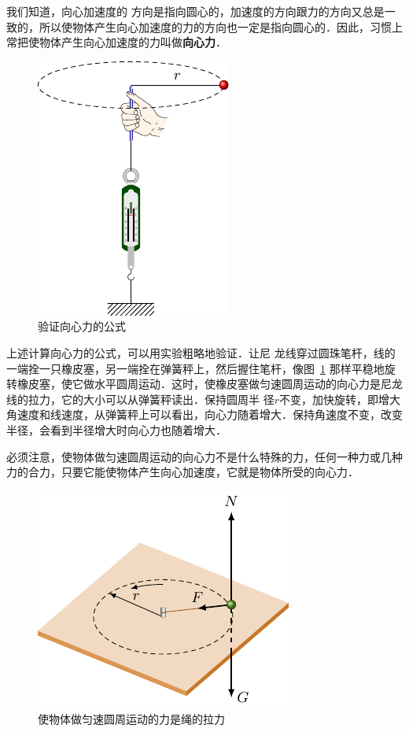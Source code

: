 我们知道，向心加速度的
方向是指向圆心的，加速度的方向跟力的方向又总是一致的，所以使物体产生向心加速度的力的方向也一定是指向圆心的．因此，习惯上常把使物体产生向心加速度的力叫做\textbf{向心力}．

\begin{figure}[htbp]
    \centering
    \includegraphics{fig/A/4-20.pdf}
    \caption{验证向心力的公式}\label{fig_A_4-20}
\end{figure}


上述计算向心力的公式，可以用实验粗略地验证．让尼
龙线穿过圆珠笔杆，线的一端拴一只橡皮塞，另一端拴在弹簧秤上，然后握住笔杆，像图~\ref{fig_A_4-20} 那样平稳地旋转橡皮塞，使它做水平圆周运动．这时，使橡皮塞做匀速圆周运动的向心力是尼龙线的拉力，它的大小可以从弹簧秤读出．保持圆周半
径$r$不变，加快旋转，即增大角速度和线速度，从弹簧秤上可以看出，向心力随着增大．保持角速度不变，改变半径，会看到半径增大时向心力也随着增大．

必须注意，使物体做匀速圆周运动的向心力不是什么特殊的力，任何一种力或几种力的合力，只要它能使物体产生向心加速度，它就是物体所受的向心力．
\begin{figure}[htbp]
    \centering
    \includegraphics{fig/A/4-21.pdf}
    \caption{使物体做匀速圆周运动的力是绳的拉力}\label{fig_A_4-21}
\end{figure}

